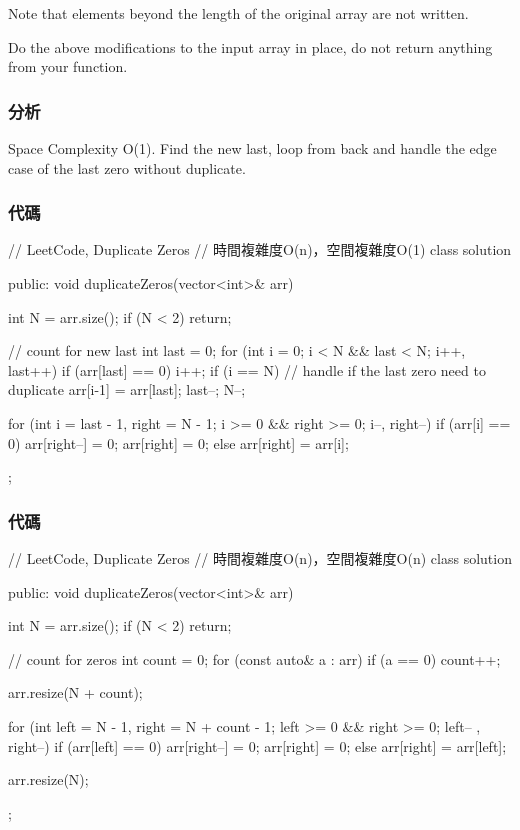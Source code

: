 Note that elements beyond the length of the original array are not written.

Do the above modifications to the input array in place, do not return anything from your function.


\subsubsection{分析}
Space Complexity O(1). Find the new last, loop from back and handle the edge case of the last zero without duplicate.

\subsubsection{代碼}
\begin{Code}
// LeetCode, Duplicate Zeros
// 時間複雜度O(n)，空間複雜度O(1)
class solution{
public:
    void duplicateZeros(vector<int>& arr) {
        int N = arr.size();
        if (N < 2) return;

        // count for new last
        int last = 0;
        for (int i = 0; i < N && last < N; i++, last++) {
            if (arr[last] == 0)
                i++;
            if (i == N) { // handle if the last zero need to duplicate
                arr[i-1] = arr[last];
                last--;
                N--;
            }
        }

        for (int i = last - 1, right = N - 1; i >= 0 && right >= 0; i--, right--) {
            if (arr[i] == 0) {
                arr[right--] = 0;
                arr[right] = 0;
            }
            else
                arr[right] = arr[i];
        }
    }
};
\end{Code}

\subsubsection{代碼}
\begin{Code}
// LeetCode, Duplicate Zeros
// 時間複雜度O(n)，空間複雜度O(n)
class solution{
public:
    void duplicateZeros(vector<int>& arr) {
        int N = arr.size();
        if (N < 2) return;

        // count for zeros
        int count = 0;
        for (const auto& a : arr) if (a == 0) count++;

        arr.resize(N + count);

        for (int left = N - 1, right = N + count - 1;
                 left >= 0 && right >= 0; left-- , right--) {
            if (arr[left] == 0) {
                arr[right--] = 0;
                arr[right] = 0;
            }
            else
                arr[right] = arr[left];
        }

        arr.resize(N);
    }
};
\end{Code}


